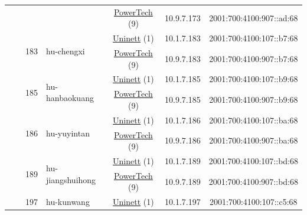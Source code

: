 \begin{small}
\begin{center}
\begin{longtable}{|c|c|c|c|c|c|c|c|}
  &  &  &  & \multicolumn{2}{|c|}{\tiny{\href{http://www.powertech.no}{PowerTech} (9)}} & \tiny{10.9.7.173} & \tiny{2001:700:4100:907::ad:68} \\* \cline{3-3}\cline{4-4}\cline{5-5}\cline{6-6}\cline{7-7}\cline{8-8}
  &  & \multirow{2}{*}{\tiny{183}} & \multicolumn{1}{|l|}{\multirow{2}{*}{\tiny{hu-chengxi}}} & \multicolumn{2}{|c|}{\tiny{\href{https://www.uninett.no}{Uninett} (1)}} & \tiny{10.1.7.183} & \tiny{2001:700:4100:107::b7:68} \\* \cline{5-5}\cline{6-6}\cline{7-7}\cline{8-8}
  &  &  &  & \multicolumn{2}{|c|}{\tiny{\href{http://www.powertech.no}{PowerTech} (9)}} & \tiny{10.9.7.183} & \tiny{2001:700:4100:907::b7:68} \\* \cline{3-3}\cline{4-4}\cline{5-5}\cline{6-6}\cline{7-7}\cline{8-8}
  &  & \multirow{2}{*}{\tiny{185}} & \multicolumn{1}{|l|}{\multirow{2}{*}{\tiny{hu-hanbaokuang}}} & \multicolumn{2}{|c|}{\tiny{\href{https://www.uninett.no}{Uninett} (1)}} & \tiny{10.1.7.185} & \tiny{2001:700:4100:107::b9:68} \\* \cline{5-5}\cline{6-6}\cline{7-7}\cline{8-8}
  &  &  &  & \multicolumn{2}{|c|}{\tiny{\href{http://www.powertech.no}{PowerTech} (9)}} & \tiny{10.9.7.185} & \tiny{2001:700:4100:907::b9:68} \\* \cline{3-3}\cline{4-4}\cline{5-5}\cline{6-6}\cline{7-7}\cline{8-8}
  &  & \multirow{2}{*}{\tiny{186}} & \multicolumn{1}{|l|}{\multirow{2}{*}{\tiny{hu-yuyintan}}} & \multicolumn{2}{|c|}{\tiny{\href{https://www.uninett.no}{Uninett} (1)}} & \tiny{10.1.7.186} & \tiny{2001:700:4100:107::ba:68} \\* \cline{5-5}\cline{6-6}\cline{7-7}\cline{8-8}
  &  &  &  & \multicolumn{2}{|c|}{\tiny{\href{http://www.powertech.no}{PowerTech} (9)}} & \tiny{10.9.7.186} & \tiny{2001:700:4100:907::ba:68} \\* \cline{3-3}\cline{4-4}\cline{5-5}\cline{6-6}\cline{7-7}\cline{8-8}
  &  & \multirow{2}{*}{\tiny{189}} & \multicolumn{1}{|l|}{\multirow{2}{*}{\tiny{hu-jiangshuihong}}} & \multicolumn{2}{|c|}{\tiny{\href{https://www.uninett.no}{Uninett} (1)}} & \tiny{10.1.7.189} & \tiny{2001:700:4100:107::bd:68} \\* \cline{5-5}\cline{6-6}\cline{7-7}\cline{8-8}
  &  &  &  & \multicolumn{2}{|c|}{\tiny{\href{http://www.powertech.no}{PowerTech} (9)}} & \tiny{10.9.7.189} & \tiny{2001:700:4100:907::bd:68} \\* \cline{3-3}\cline{4-4}\cline{5-5}\cline{6-6}\cline{7-7}\cline{8-8}
  &  & \multirow{2}{*}{\tiny{197}} & \multicolumn{1}{|l|}{\multirow{2}{*}{\tiny{hu-kunwang}}} & \multicolumn{2}{|c|}{\tiny{\href{https://www.uninett.no}{Uninett} (1)}} & \tiny{10.1.7.197} & \tiny{2001:700:4100:107::c5:68} \\* \cline{5-5}\cline{6-6}\cline{7-7}\cline{8-8}

\end{longtable}
\end{center}
\end{small}
